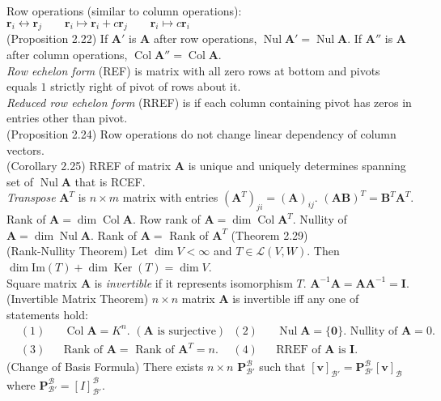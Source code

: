 \documentclass{article}
\theoremstyle{definition}
\DeclareMathOperator{\Ker}{Ker}
\renewcommand{\Im}{\text{Im}}
\DeclareMathOperator{\Nul}{Nul}
\DeclareMathOperator{\Col}{Col}
\begin{document}
Row operations (similar to column operations): $\mathbf{r}_{i}\leftrightarrow\mathbf{r}_{j}\qquad\mathbf{r}_{i}\mapsto\mathbf{r}_{i}+c\mathbf{r}_{j}\qquad\mathbf{r}_{i}\mapsto c\mathbf{r}_{i}$\\
(Proposition 2.22) If $\mathbf{A}'$ is $\mathbf{A}$ after row operations, $\Nul\mathbf{A}'=\Nul\mathbf{A}$. If $\mathbf{A}''$ is $\mathbf{A}$ after column operations, $\Col\mathbf{A}''=\Col\mathbf{A}$.\\
\textit{Row echelon form} (REF) is matrix with all zero rows at bottom and pivots equals $1$ strictly right of pivot of rows about it.\\
\textit{Reduced row echelon form} (RREF) is if each column containing pivot has zeros in entries other than pivot.\\
(Proposition 2.24) Row operations do not change linear dependency of column vectors.\\
(Corollary 2.25) RREF of matrix $\mathbf{A}$ is unique and uniquely determines spanning set of $\Nul\mathbf{A}$ that is RCEF.\\
\textit{Transpose} $\mathbf{A}^{T}$ is $n\times m$ matrix with entries $(\mathbf{A}^{T})_{ji}=(\mathbf{A})_{ij}$. $(\mathbf{AB})^{T}=\mathbf{B}^{T}\mathbf{A}^{T}$.\\
Rank of $\mathbf{A}=\dim\Col\mathbf{A}$. Row rank of $\mathbf{A}=\dim\Col\mathbf{A}^{T}$. Nullity of $\mathbf{A}=\dim\Nul\mathbf{A}$. Rank of $\mathbf{A}=$ Rank of $\mathbf{A}^{T}$ (Theorem 2.29)\\
(Rank-Nullity Theorem) Let $\dim V<\infty$ and $T\in\mathscr{L}(V,W)$. Then $\dim\Im(T)+\dim\Ker(T)=\dim V$.\\
Square matrix $\mathbf{A}$ is \textit{invertible} if it represents isomorphism $T$. $\mathbf{A}^{-1}\mathbf{A}=\mathbf{AA}^{-1}=\mathbf{I}$.\\
(Invertible Matrix Theorem) $n\times n$ matrix $\mathbf{A}$ is invertible iff any one of statements hold:
\begin{align*}
    &(1) & &\Col\mathbf{A}=K^{n}\text{. }(\mathbf{A}\text{ is surjective}) & &(2) & &\Nul\mathbf{A}=\{\mathbf{0}\}\text{. Nullity of }\mathbf{A}=0\text{.}\\
    &(3) & &\text{Rank of }\mathbf{A}=\text{ Rank of }\mathbf{A}^{T}=n\text{. } & &(4) & &\text{RREF of }\mathbf{A}\text{ is }\mathbf{I}\text{.}
\end{align*}
(Change of Basis Formula) There exists $n\times n$ $\mathbf{P}_{\mathcal{B}'}^{\mathcal{B}}$ such that $\left[\mathbf{v}\right]_{\mathcal{B}'}=\mathbf{P}_{\mathcal{B}'}^{\mathcal{B}}\left[\mathbf{v}\right]_{\mathcal{B}}$ where $\mathbf{P}_{\mathcal{B}'}^{\mathcal{B}}=\left[I\right]_{\mathcal{B}'}^{\mathcal{B}}$.\\
\end{document}

